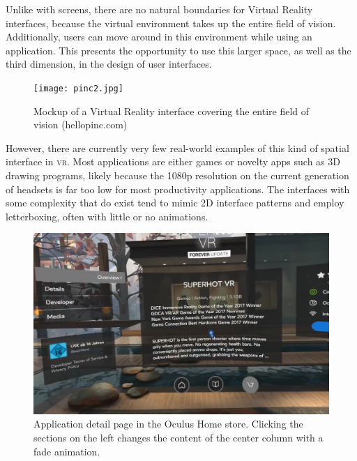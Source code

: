 \documentclass{tufte-book} %
\begin{document}

Unlike with screens, there are no natural boundaries for Virtual Reality interfaces, because the virtual environment takes up the entire field of vision. Additionally, users can move around in this environment while using an application. This presents the opportunity to use this larger space, as well as the third dimension, in the design of user interfaces.

\begin{figure}
  \texttt{[image: pinc2.jpg]}
  \caption{Mockup of a Virtual Reality interface covering the entire field of vision (hellopinc.com)}
  \label{fig:noboundaries}
\end{figure}

However, there are currently very few real-world examples of this kind of spatial interface in \textsc{vr}. Most applications are either games or novelty apps such as 3D drawing programs, likely because the 1080p resolution on the current generation of headsets is far too low for most productivity applications.
The interfaces with some complexity that do exist tend to mimic 2D interface patterns and employ letterboxing, often with little or no animations.

\begin{figure}
  \includegraphics{superhot.png}
  \caption{Application detail page in the Oculus Home store. Clicking the sections on the left changes the content of the center column with a fade animation.}
  \label{fig:superhot}
\end{figure}
\end{document}
